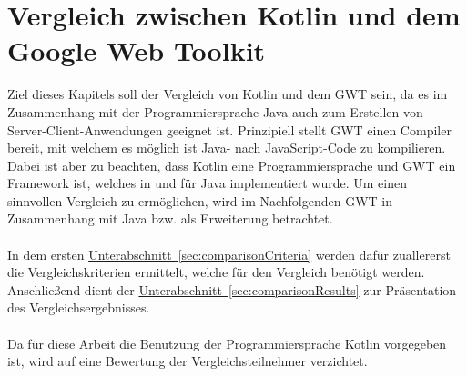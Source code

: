 
\chapter{Vergleich zwischen Kotlin und dem Google Web Toolkit}\label{sec:comparison}
Ziel dieses Kapitels soll der Vergleich von Kotlin und dem \gls{GWT} sein, da es im Zusammenhang mit der Programmiersprache Java auch zum Erstellen von Server-Client-Anwendungen geeignet ist.
Prinzipiell stellt \gls{GWT} einen Compiler bereit, mit welchem es möglich ist Java- nach JavaScript-Code zu kompilieren. Dabei ist aber zu beachten, dass Kotlin eine Programmiersprache und \gls{GWT} ein Framework ist, welches in und für Java implementiert wurde. Um einen sinnvollen Vergleich zu ermöglichen, wird im Nachfolgenden \gls{GWT} in Zusammenhang mit Java bzw. als Erweiterung betrachtet.\\
\\
In dem ersten \hyperref[sec:comparisonCriteria]{Unterabschnitt~\ref{sec:comparisonCriteria}} werden dafür zuallererst die Vergleichskriterien ermittelt, welche für den Vergleich benötigt werden. Anschließend dient der \hyperref[sec:comparisonResults]{Unterabschnitt~\ref{sec:comparisonResults}} zur Präsentation des Vergleichsergebnisses.\\
\\
Da für diese Arbeit die Benutzung der Programmiersprache Kotlin vorgegeben ist, wird auf eine Bewertung der Vergleichsteilnehmer verzichtet.

